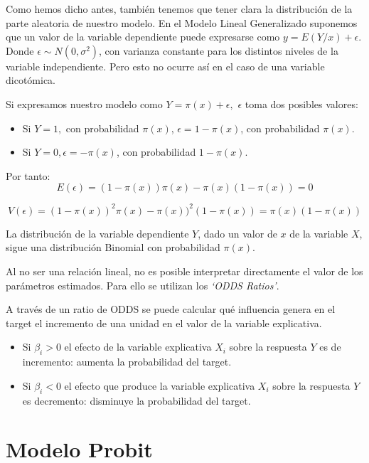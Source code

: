 \documentclass[]{book}
\providecommand{\tightlist}{%
  \setlength{\itemsep}{0pt}\setlength{\parskip}{0pt}}
\begin{document}
Como hemos dicho antes, también tenemos que tener clara la distribución de la parte aleatoria de nuestro modelo. En el Modelo Lineal Generalizado suponemos que un valor de la variable dependiente puede expresarse como \(y=E(Y/x)+\epsilon.\) Donde \(\epsilon\sim N(0,\sigma^2)\), con varianza constante para los distintos niveles de la variable independiente. Pero esto no ocurre así en el caso de una variable dicotómica.

Si expresamos nuestro modelo como \(Y = \pi(x) + \epsilon,\) \(\epsilon\) toma dos posibles valores:

\begin{itemize}
\tightlist
\item
  Si \(Y=1,\) con probabilidad \(\pi(x)\), \(\epsilon= 1-\pi(x)\), con probabilidad \(\pi(x)\).
\item
  Si \(Y=0, \epsilon = -\pi(x)\), con probabilidad \(1-\pi(x)\).
\end{itemize}

Por tanto:
\[
E(\epsilon)= (1-\pi(x))\pi(x)-\pi(x)(1-\pi(x))=0
\]

\[
V(\epsilon) = (1-\pi(x))^2\pi(x)-\pi(x))^2(1-\pi(x))=\pi(x)(1-\pi(x))
\]

La distribución de la variable dependiente \(Y\), dado un valor de \(x\) de la variable \(X\), sigue una distribución Binomial con probabilidad \(\pi(x)\).

Al no ser una relación lineal, no es posible interpretar directamente el valor de los parámetros estimados.
Para ello se utilizan los \emph{`ODDS Ratios'}.

A través de un ratio de ODDS se puede calcular qué influencia genera en el target el incremento de una unidad en el valor de la variable explicativa.

\begin{itemize}
\tightlist
\item
  Si \(\beta_i > 0\) el efecto de la variable explicativa \(X_i\) sobre la respuesta \(Y\) es de incremento: aumenta la probabilidad del target.
\item
  Si \(\beta_i < 0\) el efecto que produce la variable explicativa \(X_i\) sobre la respuesta \(Y\) es decremento: disminuye la probabilidad del target.
\end{itemize}

\hypertarget{modelo-probit}{%
\section{Modelo Probit}\label{modelo-probit}}
\end{document}
